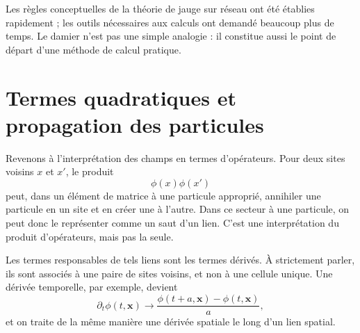 \begin{classroomqa}
\end{classroomqa}

Les règles conceptuelles de la théorie de jauge sur réseau ont été établies rapidement ; les outils nécessaires aux calculs ont demandé beaucoup plus de temps. Le damier n’est pas une simple analogie : il constitue aussi le point de départ d’une méthode de calcul pratique.

\section{Termes quadratiques et propagation des particules}

Revenons à l’interprétation des champs en termes d’opérateurs. Pour deux sites voisins \(x\) et \(x'\), le produit
\begin{equation}
\phi(x)\phi(x')
\end{equation}
peut, dans un élément de matrice à une particule approprié, annihiler une particule en un site et en créer une à l’autre. Dans ce secteur à une particule, on peut donc le représenter comme un saut d’un lien. C’est une interprétation du produit d’opérateurs, mais pas la seule.

Les termes responsables de tels liens sont les termes dérivés. À strictement parler, ils sont associés à une paire de sites voisins, et non à une cellule unique. Une dérivée temporelle, par exemple, devient
\begin{equation}
\partial_t\phi(t,\mathbf{x})
\longrightarrow
\frac{\phi(t+a,\mathbf{x})-\phi(t,\mathbf{x})}{a},
\end{equation}
et on traite de la même manière une dérivée spatiale le long d’un lien spatial.

